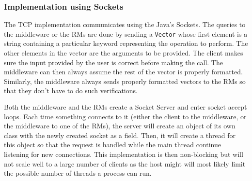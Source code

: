 \documentclass[12pt]{article}
\theoremstyle{plain}%
\theoremstyle{definition}
\theoremstyle{remark}
\newcommand{\java}[1]{{\lstinline!#1!}}
\begin{document}
\subsubsection*{Implementation using Sockets}
The TCP implementation communicates using the Java's Sockets. The
queries to the middleware or the RMs are done by sending a
\java{Vector} whose first element is a string containing a particular
keyword representing the operation to perform. The other elements in
the vector are the arguments to be provided. The client makes sure the
input provided by the user is correct before making the call. The
middleware can then always assume the rest of the vector is properly
formatted. Similarly, the middleware always sends properly formatted
vectors to the RMs so that they don't have to do such verifications. 

Both the middleware and the RMs create a Socket Server and enter
socket accept loops. Each time something connects to it (either the
client to the middleware, or the middleware to one of the RMs), the
server will create an object of its own class with the newly created
socket as a field. Then, it will create a thread for this object so
that the request is handled while the main thread continue listening
for new connections. This implementation is then non-blocking but will
not scale well to a large number of clients as the host might will
most likely limit the possible number of threads a process can run.
\end{document}
